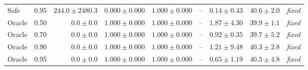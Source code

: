 {\begin{tabular}{llrrrrrrl}
Safe & 0.95 & $244.0\mathbin{\pm}2480.3$ & $0.000\mathbin{\pm}0.000$ & $1.000\mathbin{\pm}0.000$ & -- & $0.14\mathbin{\pm}0.43$ & $40.6\mathbin{\pm}2.0$ & \textit{fixed} \\
\addlinespace[1pt]
Oracle & 0.50 & $0.0\mathbin{\pm}0.0$ & $1.000\mathbin{\pm}0.000$ & $1.000\mathbin{\pm}0.000$ & -- & $1.87\mathbin{\pm}4.30$ & $39.9\mathbin{\pm}1.1$ & \textit{fixed} \\
Oracle & 0.70 & $0.0\mathbin{\pm}0.0$ & $1.000\mathbin{\pm}0.000$ & $1.000\mathbin{\pm}0.000$ & -- & $0.92\mathbin{\pm}0.35$ & $39.7\mathbin{\pm}5.2$ & \textit{fixed} \\
Oracle & 0.90 & $0.0\mathbin{\pm}0.0$ & $1.000\mathbin{\pm}0.000$ & $1.000\mathbin{\pm}0.000$ & -- & $1.21\mathbin{\pm}9.48$ & $40.3\mathbin{\pm}2.8$ & \textit{fixed} \\
Oracle & 0.95 & $0.0\mathbin{\pm}0.0$ & $1.000\mathbin{\pm}0.000$ & $1.000\mathbin{\pm}0.000$ & -- & $0.65\mathbin{\pm}1.19$ & $40.5\mathbin{\pm}4.8$ & \textit{fixed} \\
\bottomrule
\end{tabular}%
}
\endgroup
